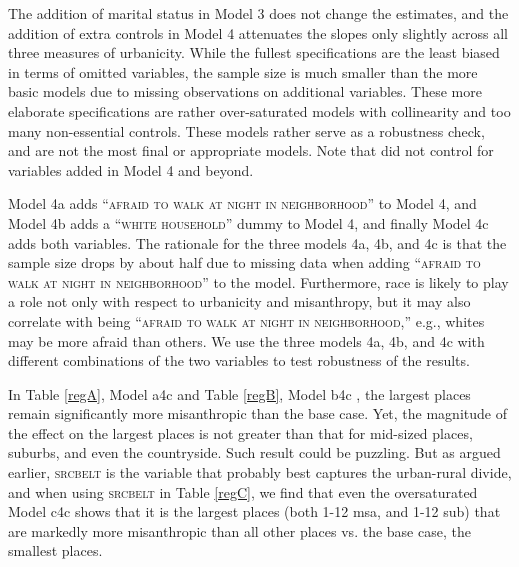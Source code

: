 \documentclass[11pt, letterpaper]{article}
\begin{document}
\begin{spacing}{1.4}
The addition of marital status in Model 3 does not change the estimates, and the addition of extra controls in Model 4 attenuates the slopes only slightly  across
all three measures of urbanicity.
{While the fullest specifications are the least biased in terms of omitted
variables, the sample size is much smaller than the more basic models due to
missing observations on additional variables. These more elaborate
specifications are rather over-saturated models with collinearity and 
too many non-essential controls. These models rather serve as a robustness check, and are not the most final or appropriate models. %
 Note that  \citet{wilson85} did not control for variables added in Model 4 and beyond.}


Model 4a adds ``\textsc{afraid to walk at night in neighborhood}'' to Model 4,
and Model 4b adds a ``\textsc{white household}'' dummy to Model 4, and finally
Model 4c adds both variables.  The rationale for the three models 4a, 4b, and 4c is
that the sample size drops by about half due to missing data when adding ``\textsc{afraid to walk at night in neighborhood}'' to the model. Furthermore, race is
likely to play a role not only with respect to urbanicity and misanthropy, but it
may also correlate with being ``\textsc{afraid to walk at night in neighborhood},'' e.g., whites may be more afraid than others. We use the three
models 4a, 4b, and 4c with different combinations of the two variables to test robustness of the results. 
%

In Table \ref{regA}, Model a4c and Table \ref{regB}, Model b4c%
, the largest places
remain significantly more misanthropic than the base case. Yet, the magnitude of the effect on the largest places is not greater than that for mid-sized places, suburbs, and even the countryside. Such result could be puzzling.
 But as argued earlier, \textsc{srcbelt} is the variable that probably best
 captures the urban-rural divide, and when using \textsc{srcbelt} in Table
 \ref{regC}, we find that even the oversaturated 
 Model c4c shows that it is the largest places (both 1-12 msa, and 1-12 sub) that are markedly more misanthropic than all other places vs. the base case, the smallest places.


\end{spacing}
\end{document}
